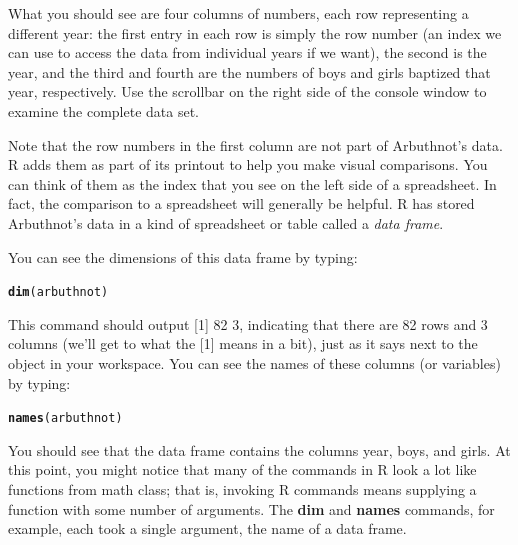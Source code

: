 \documentclass{article}\usepackage[]{graphicx}\usepackage[]{color}
\makeatletter
\newcommand{\hlstd}[1]{\textcolor[rgb]{0.345,0.345,0.345}{#1}}%
\newcommand{\hlkwd}[1]{\textcolor[rgb]{0.737,0.353,0.396}{\textbf{#1}}}%
\newenvironment{kframe}{%
 \def\at@end@of@kframe{}%
 \ifinner\ifhmode%
  \def\at@end@of@kframe{\end{minipage}}%
  \begin{minipage}{\columnwidth}%
 \fi\fi%
 \def\FrameCommand##1{\hskip\@totalleftmargin \hskip-\fboxsep
 \colorbox{shadecolor}{##1}\hskip-\fboxsep
     \hskip-\linewidth \hskip-\@totalleftmargin \hskip\columnwidth}%
 \MakeFramed {\advance\hsize-\width
   \@totalleftmargin\z@ \linewidth\hsize
   \@setminipage}}%
 {\par\unskip\endMakeFramed%
 \at@end@of@kframe}
\newenvironment{knitrout}{}{} %
\makeatother
\begin{document}
What you should see are four columns of numbers, each row representing a different year: the first entry in each row is simply the row number (an index we can use to access the data from individual years if we want), the second is the year, and the third and fourth are the numbers of boys and girls baptized that year, respectively. Use the scrollbar on the right side of the console window to examine the complete data set.

Note that the row numbers in the first column are not part of Arbuthnot's data. R adds them as part of its printout to help you make visual comparisons. You can think of them as the index that you see on the left side of a spreadsheet. In fact, the comparison to a spreadsheet will generally be helpful. R has stored Arbuthnot's data in a kind of spreadsheet or table called a \emph{data frame}.

You can see the dimensions of this data frame by typing:

\begin{knitrout}
\color{fgcolor}\begin{kframe}
\begin{alltt}
\hlkwd{dim}\hlstd{(arbuthnot)}
\end{alltt}
\end{kframe}
\end{knitrout}


This command should output \hlstd{[1] 82 3}, indicating that there are 82 rows and 3 columns (we'll get to what the \hlstd{[1]} means in a bit), just as it says next to the object in your workspace. You can see the names of these columns (or variables) by typing:

\begin{knitrout}
\color{fgcolor}\begin{kframe}
\begin{alltt}
\hlkwd{names}\hlstd{(arbuthnot)}
\end{alltt}
\end{kframe}
\end{knitrout}


You should see that the data frame contains the columns \hlstd{year},  \hlstd{boys}, and  \hlstd{girls}. At this point, you might notice that many of the commands in R look a lot like functions from math class; that is, invoking R commands means supplying a function with some number of arguments. The \hlkwd{dim} and \hlkwd{names} commands, for example, each took a single argument, the name of a data frame. 
\end{document}
